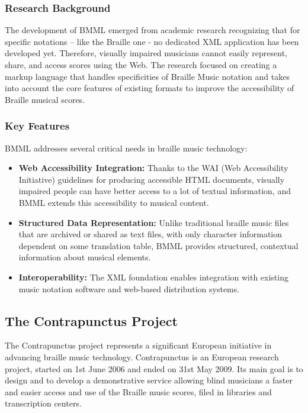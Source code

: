 \subsubsection{Research Background}
The development of BMML emerged from academic research recognizing that for specific notations – like the Braille one - no dedicated XML application has been developed yet. Therefore, visually impaired musicians cannot easily represent, share, and access scores using the Web. The research focused on creating a markup language that handles specificities of Braille Music notation and takes into account the core features of existing formats to improve the accessibility of Braille musical scores.

\subsubsection{Key Features}
BMML addresses several critical needs in braille music technology:
\begin{itemize}
    \item \textbf{Web Accessibility Integration:} Thanks to the WAI (Web Accessibility Initiative) guidelines for producing accessible HTML documents, visually impaired people can have better access to a lot of textual information, and BMML extends this accessibility to musical content.
    \item \textbf{Structured Data Representation:} Unlike traditional braille music files that are archived or shared as text files, with only character information dependent on some translation table, BMML provides structured, contextual information about musical elements.
    \item \textbf{Interoperability:} The XML foundation enables integration with existing music notation software and web-based distribution systems.
\end{itemize}

\subsection{The Contrapunctus Project}

The Contrapunctus project represents a significant European initiative in advancing braille music technology. Contrapunctus is an European research project, started on 1st June 2006 and ended on 31st May 2009. Its main goal is to design and to develop a demonstrative service allowing blind musicians a faster and easier access and use of the Braille music scores, filed in libraries and transcription centers.

